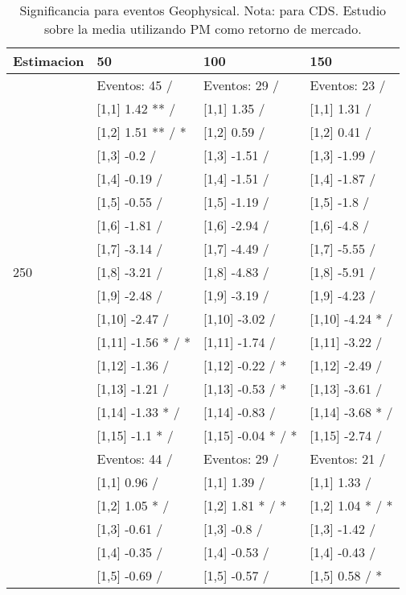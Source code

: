 \begin{table}

\caption{Significancia para eventos Geophysical. Nota: para CDS. Estudio sobre la media utilizando PM como retorno de mercado.}
\centering
\begin{tabular}[t]{llll}
\toprule
Estimacion & 50 & 100 & 150\\
\midrule
 & Eventos:  45 / & Eventos:  29 / & Eventos:  23 /\\
 & {}[1,1] 1.42 ** / & {}[1,1] 1.35  / & {}[1,1] 1.31  /\\
 & {}[1,2] 1.51 ** / * & {}[1,2] 0.59  / & {}[1,2] 0.41  /\\
 & {}[1,3] -0.2  / & {}[1,3] -1.51  / & {}[1,3] -1.99  /\\
 & {}[1,4] -0.19  / & {}[1,4] -1.51  / & {}[1,4] -1.87  /\\
\addlinespace
 & {}[1,5] -0.55  / & {}[1,5] -1.19  / & {}[1,5] -1.8  /\\
 & {}[1,6] -1.81  / & {}[1,6] -2.94  / & {}[1,6] -4.8  /\\
 & {}[1,7] -3.14  / & {}[1,7] -4.49  / & {}[1,7] -5.55  /\\
250 & {}[1,8] -3.21  / & {}[1,8] -4.83  / & {}[1,8] -5.91  /\\
 & {}[1,9] -2.48  / & {}[1,9] -3.19  / & {}[1,9] -4.23  /\\
\addlinespace
 & {}[1,10] -2.47  / & {}[1,10] -3.02  / & {}[1,10] -4.24 * /\\
 & {}[1,11] -1.56 * / * & {}[1,11] -1.74  / & {}[1,11] -3.22  /\\
 & {}[1,12] -1.36  / & {}[1,12] -0.22  / * & {}[1,12] -2.49  /\\
 & {}[1,13] -1.21  / & {}[1,13] -0.53  / * & {}[1,13] -3.61  /\\
 & {}[1,14] -1.33 * / & {}[1,14] -0.83  / & {}[1,14] -3.68 * /\\
\addlinespace
 & {}[1,15] -1.1 * / & {}[1,15] -0.04 * / * & {}[1,15] -2.74  /\\
 & Eventos:  44 / & Eventos:  29 / & Eventos:  21 /\\
 & {}[1,1] 0.96  / & {}[1,1] 1.39  / & {}[1,1] 1.33  /\\
 & {}[1,2] 1.05 * / & {}[1,2] 1.81 * / * & {}[1,2] 1.04 * / *\\
 & {}[1,3] -0.61  / & {}[1,3] -0.8  / & {}[1,3] -1.42  /\\
\addlinespace
 & {}[1,4] -0.35  / & {}[1,4] -0.53  / & {}[1,4] -0.43  /\\
 & {}[1,5] -0.69  / & {}[1,5] -0.57  / & {}[1,5] 0.58  / *\\

\end{tabular}
\end{table}
